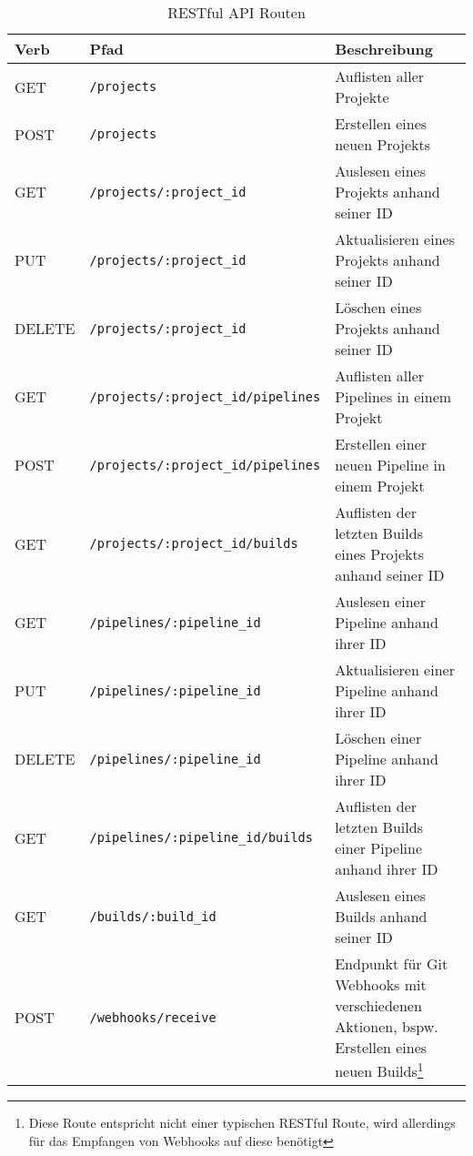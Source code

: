 \begin{table}[H]
  \footnotesize
  \begin{tabularx}{\textwidth}{| l | l | X |}
    \hline
    \textbf{Verb} & \textbf{Pfad} & \textbf{Beschreibung} \\ \hline
    GET & {\scriptsize \texttt{/projects}} & Auflisten aller Projekte \\ \hline
    POST & {\scriptsize \texttt{/projects}} & Erstellen eines neuen Projekts \\ \hline
    GET & {\scriptsize \texttt{/projects/:project\_id}} & Auslesen eines Projekts anhand seiner ID \\ \hline
    PUT & {\scriptsize \texttt{/projects/:project\_id}} & Aktualisieren eines Projekts anhand seiner ID \\ \hline
    DELETE & {\scriptsize \texttt{/projects/:project\_id}} & Löschen eines Projekts anhand seiner ID \\ \hline
    GET & {\scriptsize \texttt{/projects/:project\_id/pipelines}} & Auflisten aller Pipelines in einem Projekt \\ \hline
    POST & {\scriptsize \texttt{/projects/:project\_id/pipelines}} & Erstellen einer neuen Pipeline in einem Projekt \\ \hline
    GET & {\scriptsize \texttt{/projects/:project\_id/builds}} & Auflisten der letzten Builds eines Projekts anhand seiner ID \\ \hline
    GET & {\scriptsize \texttt{/pipelines/:pipeline\_id}} & Auslesen einer Pipeline anhand ihrer ID \\ \hline
    PUT & {\scriptsize \texttt{/pipelines/:pipeline\_id}} & Aktualisieren einer Pipeline anhand ihrer ID \\ \hline
    DELETE & {\scriptsize \texttt{/pipelines/:pipeline\_id}} & Löschen einer Pipeline anhand ihrer ID \\ \hline
    GET & {\scriptsize \texttt{/pipelines/:pipeline\_id/builds}} & Auflisten der letzten Builds einer Pipeline anhand ihrer ID \\ \hline
    GET & {\scriptsize \texttt{/builds/:build\_id}} & Auslesen eines Builds anhand seiner ID \\
    \hline\hline
    POST & {\scriptsize \texttt{/webhooks/receive}} & Endpunkt für Git Webhooks mit verschiedenen Aktionen, bspw. Erstellen eines neuen Builds\footnote{Diese Route entspricht nicht einer typischen RESTful Route, wird allerdings für das Empfangen von Webhooks auf diese benötigt} \\
    \hline
  \end{tabularx}
  \caption{RESTful API Routen}
  \label{tab:rest-routes}
\end{table}

